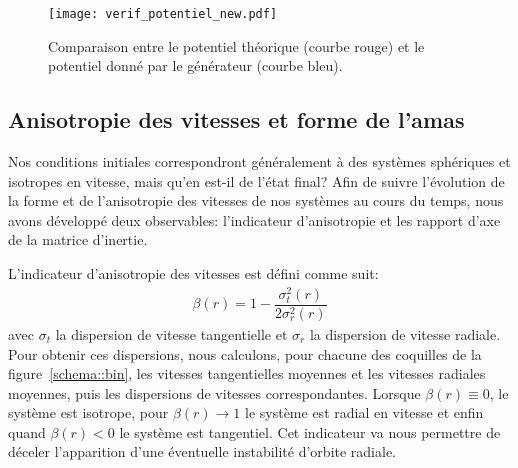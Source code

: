 

			\begin{figure}[h!]
				\centering \texttt{[image: verif\_potentiel\_new.pdf]}
				\caption{Comparaison entre le potentiel théorique (courbe rouge) et le potentiel donné par le
					générateur (courbe bleu)\label{potentiel_5000}.}
			\end{figure}

		\subsection{Anisotropie des vitesses et forme de l'amas}

			Nos conditions initiales correspondront généralement à des systèmes sphériques et isotropes en vitesse, mais
			qu'en est-il de l'état final?
			Afin de suivre l'évolution de la forme et de l'anisotropie des vitesses de nos systèmes au cours
			du temps, nous avons développé deux observables:
			l'indicateur d'anisotropie et les rapport d'axe de la matrice d'inertie.

			L'indicateur d'anisotropie des vitesses est défini comme suit:
			\begin{align}
				\beta(r) = 1 - \dfrac{\sigma_t^2(r)}{2\sigma_r^2(r)}
			\end{align}
			avec $\sigma_t$ la dispersion de vitesse tangentielle et $\sigma_r$ la dispersion de vitesse
			radiale. Pour obtenir ces dispersions, nous calculons, pour chacune des coquilles de la
			figure~\ref{schema::bin}, les vitesses tangentielles moyennes et les vitesses radiales moyennes,
			puis les dispersions de vitesses correspondantes.
			Lorsque $\beta(r) \equiv 0$, le système est isotrope, pour $\beta(r) \rightarrow 1$ le système
			est radial en vitesse et enfin quand $\beta(r) < 0$ le système est tangentiel.
			Cet indicateur va nous permettre de déceler l'apparition d'une éventuelle instabilité
			d'orbite radiale.

